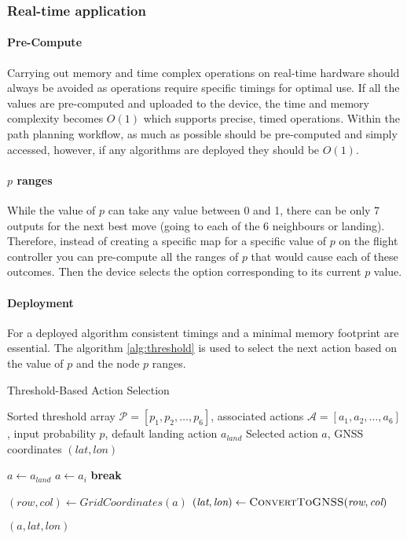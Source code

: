 \subsubsection{Real-time application}\label{sub_sub_section:tgt_real_time}
\paragraph{Pre-Compute}
Carrying out memory and time complex operations on real-time hardware should always be avoided as operations require specific timings for optimal use. If all the values are pre-computed and uploaded to the device, the time and memory complexity becomes $O(1)$ which supports precise, timed operations. Within the path planning workflow, as much as possible should be pre-computed and simply accessed, however, if any algorithms are deployed they should be $O(1)$.
\paragraph{$p$ ranges}
While the value of $p$ can take any value between 0 and 1, there can be only 7 outputs for the next best move (going to each of the 6 neighbours or landing). Therefore, instead of creating a specific map for a specific value of $p$ on the flight controller you can pre-compute all the ranges of $p$ that would cause each of these outcomes. Then the device selects the option corresponding to its current $p$ value.
\paragraph{Deployment}
For a deployed algorithm consistent timings and a minimal memory footprint are essential. The algorithm \ref{alg:threshold} is used to select the next action based on the value of $p$ and the node $p$ ranges.
\begin{algorithm}[htbp]
  \caption{Threshold-Based Action Selection}
  \label{alg:threshold}
  \begin{algorithmic}[1]
    \Require Sorted threshold array \(\mathcal{P} = [p_1, p_2, \dots, p_6]\), associated actions \(\mathcal{A} = [a_1, a_2, \dots, a_6]\), input probability \(p\), default landing action \(a_{\textit{land}}\)
    \Ensure Selected action \(a\), GNSS coordinates \((\textit{lat}, \textit{lon})\)
    
    \State \(a \gets a_{\textit{land}}\) 
        \State \(a \gets a_i\)
        \State \textbf{break}
      \EndIf
    \EndFor
    
    \State \((\textit{row}, \textit{col}) \gets \textit{GridCoordinates}(a)\)
    \State \((\textit{lat}, \textit{lon}) \gets \Call{ConvertToGNSS}{\textit{row}, \textit{col}}\)
    
    \State \Return \((a, \textit{lat}, \textit{lon})\)
  \end{algorithmic}
\end{algorithm}
